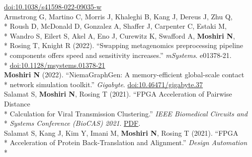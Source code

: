 \documentclass[margin,line]{res}
\begin{document}
\begin{resume}
\hspace*{8mm} \href{https://doi.org/10.1038/s41598-022-09035-w}{doi:10.1038/s41598-022-09035-w}\\
\hspace*{4mm} Armstrong G, Martino C, Morris J, Khaleghi B, Kang J, Dereus J, Zhu Q,\\*
\hspace*{9mm} Roush D, McDonald D, Gonzalez A, Shaffer J, Carpenter C, Estaki M,\\*
\hspace*{9mm} Wandro S, Eilert S, Akel A, Eno J, Curewitz K, Swafford A, \textbf{Moshiri N},\\*
\hspace*{9mm} Rosing T, Knight R (2022). ``Swapping metagenomics preprocessing pipeline\\*
\hspace*{9mm} components offers speed and sensitivity increases.'' \textit{mSystems}. e01378-21.\\*\vspace{2mm}
\hspace*{8mm} \href{https://doi.org/10.1128/msystems.01378-21}{doi:10.1128/msystems.01378-21}\\
\hspace*{4mm} \textbf{Moshiri N} (2022). ``NiemaGraphGen: A memory-efficient global-scale contact\\*\vspace{2mm}
\hspace*{8mm} network simulation toolkit.'' \textit{Gigabyte}. \href{https://doi.org/10.46471/gigabyte.37}{doi:10.46471/gigabyte.37}\\
\hspace*{4mm} Salamat S, \textbf{Moshiri N}, Rosing T (2021). ``FPGA Acceleration of Pairwise Distance\\*
\hspace*{9mm} Calculation for Viral Transmission Clustering.'' \textit{IEEE Biomedical Circuits and}\\*\vspace{2mm}
\hspace*{8mm} \textit{Systems Conference (BioCAS) 2021}. \href{https://par.nsf.gov/servlets/purl/10323850}{PDF}.\\
\hspace*{4mm} Salamat S, Kang J, Kim Y, Imani M, \textbf{Moshiri N}, Rosing T (2021). ``FPGA\\*
\hspace*{9mm} Acceleration of Protein Back-Translation and Alignment.'' \textit{Design Automation}\\*\vspace{2mm}

\end{resume}
\end{document}
